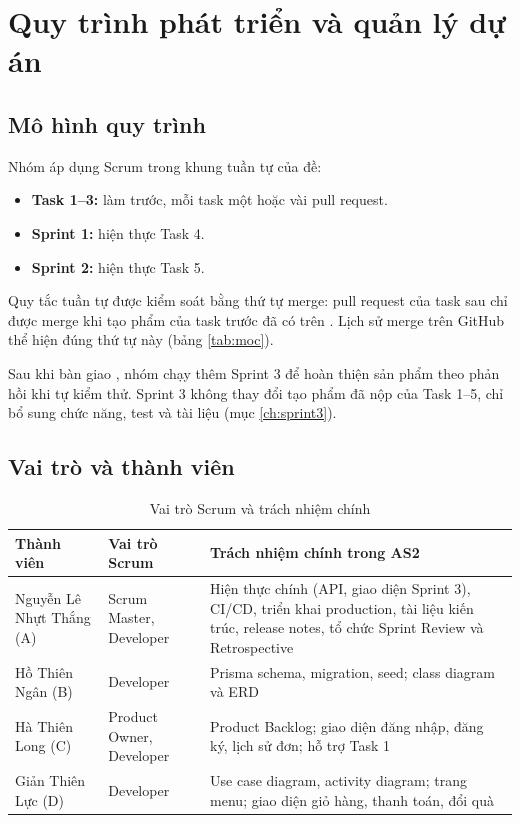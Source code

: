 \section{Quy trình phát triển và quản lý dự án}\label{ch:scrum}

\subsection{Mô hình quy trình}
Nhóm áp dụng Scrum trong khung tuần tự của đề:
\begin{itemize}
\item \textbf{Task 1--3:} làm trước, mỗi task một hoặc vài pull request.
\item \textbf{Sprint 1:} hiện thực Task 4.
\item \textbf{Sprint 2:} hiện thực Task 5.
\end{itemize}

Quy tắc tuần tự được kiểm soát bằng thứ tự merge: pull request của task sau chỉ được merge khi tạo phẩm của task trước đã có trên . Lịch sử merge trên GitHub thể hiện đúng thứ tự này (bảng \ref{tab:moc}).

Sau khi bàn giao , nhóm chạy thêm Sprint 3 để hoàn thiện sản phẩm theo phản hồi khi tự kiểm thử. Sprint 3 không thay đổi tạo phẩm đã nộp của Task 1--5, chỉ bổ sung chức năng, test và tài liệu (mục \ref{ch:sprint3}).

\subsection{Vai trò và thành viên}
\begin{table}[H]
\centering
\caption{Vai trò Scrum và trách nhiệm chính}\label{tab:vaitro}
\begin{tabular}{@{}L{3.6cm}L{3.2cm}L{7cm}@{}}
\toprule
\textbf{Thành viên} & \textbf{Vai trò Scrum} & \textbf{Trách nhiệm chính trong AS2} \\ \midrule
Nguyễn Lê Nhựt Thắng (A) & Scrum Master, Developer & Hiện thực chính (API, giao diện Sprint 3), CI/CD, triển khai production, tài liệu kiến trúc, release notes, tổ chức Sprint Review và Retrospective \\
Hồ Thiên Ngân (B) & Developer & Prisma schema, migration, seed; class diagram và ERD \\
Hà Thiên Long (C) & Product Owner, Developer & Product Backlog; giao diện đăng nhập, đăng ký, lịch sử đơn; hỗ trợ Task 1 \\
Giản Thiên Lực (D) & Developer & Use case diagram, activity diagram; trang menu; giao diện giỏ hàng, thanh toán, đổi quà \\
\bottomrule
\end{tabular}
\end{table}

